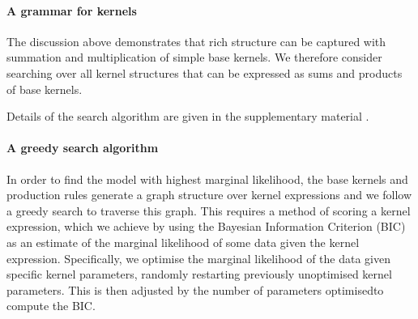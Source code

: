 \documentclass[twoside]{article}
\begin{document}
\paragraph{A grammar for kernels}

The discussion above demonstrates that rich structure can be captured with summation and multiplication of simple base kernels.
We therefore consider searching over all kernel structures that can be expressed as sums and products of base kernels.


Details of the search algorithm are given in the supplementary material .

\paragraph{A greedy search algorithm}
In order to find the model with highest marginal likelihood, the base kernels and production rules generate a graph structure over kernel expressions and we follow a greedy search to traverse this graph.
This requires a method of scoring a kernel expression, which we achieve by using the Bayesian Information Criterion (BIC) as an estimate of the marginal likelihood of some data given the kernel expression\footnotemark.
Specifically, we optimise the marginal likelihood of the data given specific kernel parameters, randomly restarting previously unoptimised kernel parameters.
This is then adjusted by the number of parameters optimised\footnotemark to compute the BIC.
\end{document}
